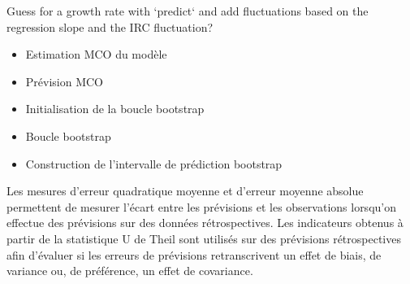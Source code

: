 Guess for a growth rate with `predict` and add fluctuations based on the regression slope and the IRC fluctuation? \\

\begin{itemize}
    \item Estimation MCO du modèle
    \item Prévision MCO
    \item Initialisation de la boucle bootstrap
    \item Boucle bootstrap
    \item Construction de l’intervalle de prédiction bootstrap
\end{itemize}

Les mesures d’erreur quadratique moyenne et d’erreur moyenne absolue permettent de mesurer l’écart entre les prévisions et les observations lorsqu’on effectue
des prévisions sur des données rétrospectives. Les indicateurs obtenus à partir de la statistique U de Theil sont utilisés sur des prévisions rétrospectives afin d’évaluer si les erreurs de prévisions retranscrivent un effet de biais, de variance ou, de préférence, un
effet de covariance.